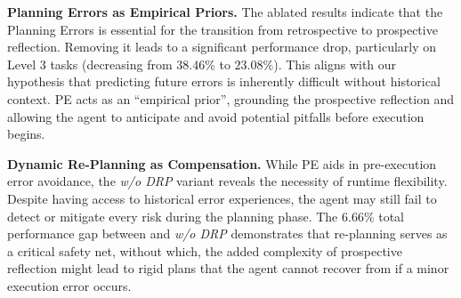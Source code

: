 \begin{table}[ht]
    \caption{Ablation studies on the planning errors (denoted as PE) and the dynamic re-planning (denoted as DRP). Results are from GPT-4.1 as the backbone LLM on the GAIA validation set.}
    \label{tab:ablation}
    \centering
\end{table}

\noindent\textbf{Planning Errors as Empirical Priors.} The ablated results indicate that the Planning Errors is essential for the transition from retrospective to prospective reflection. Removing it leads to a significant performance drop, particularly on Level 3 tasks (decreasing from $38.46\%$ to $23.08\%$). This aligns with our hypothesis that predicting future errors is inherently difficult without historical context. PE acts as an ``empirical prior'', grounding the prospective reflection and allowing the agent to anticipate and avoid potential pitfalls before execution begins.

\noindent\textbf{Dynamic Re-Planning as Compensation.} While PE aids in pre-execution error avoidance, the \textit{w/o DRP} variant reveals the necessity of runtime flexibility. Despite having access to historical error experiences, the agent may still fail to detect or mitigate every risk during the planning phase. The $6.66\%$ total performance gap between \method and \textit{w/o DRP} demonstrates that re-planning serves as a critical safety net, without which, the added complexity of prospective reflection might lead to rigid plans that the agent cannot recover from if a minor execution error occurs.



